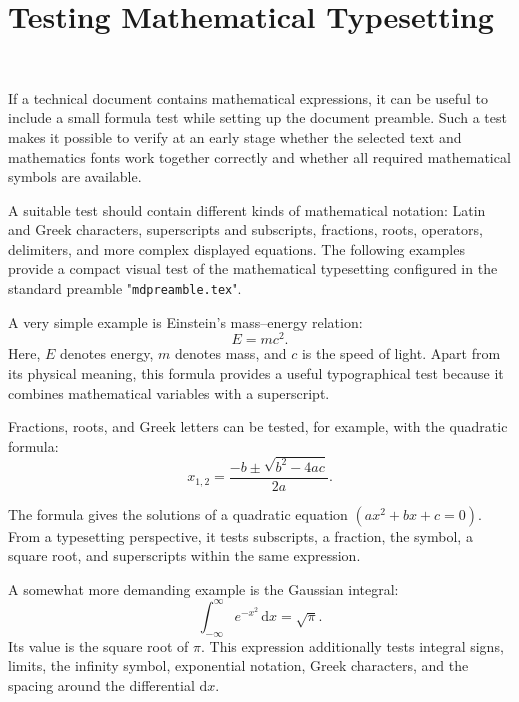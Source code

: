 \documentclass[
11pt,
a4paper,
oneside
]{scrbook}
\begin{document}
\section{Testing Mathematical Typesetting}
\label{sec:FormulaTest}
\begin{center}
	\\ 
\end{center}
If a technical document contains mathematical expressions, it can be useful to include a small formula test while setting up the document preamble. Such a test makes it possible to verify at an early stage whether the selected text and mathematics fonts work together correctly and whether all required mathematical symbols are available.

A suitable test should contain different kinds of mathematical notation: Latin and Greek characters, superscripts and subscripts, fractions, roots, operators, delimiters, and more complex displayed equations. The following examples provide a compact visual test of the mathematical typesetting configured in the standard \MDWordmark preamble "\texttt{mdpreamble.tex}".

A very simple example is Einstein's mass--energy relation:
\begin{equation}
	E = mc^2 .
	\tag{4.1}
\end{equation}
Here, $E$ denotes energy, $m$ denotes mass, and $c$ is the speed of light. Apart from its physical meaning, this formula provides a useful typographical test because it combines mathematical variables with a superscript.

Fractions, roots, and Greek letters can be tested, for example, with the quadratic formula:
\begin{equation}
	x_{1,2}
	=
	\frac{-b \pm \sqrt{b^2-4ac}}{2a}.
	\tag{4.2}
\end{equation}

The formula gives the solutions of a quadratic equation $(ax^2+bx+c=0)$. From a typesetting perspective, it tests subscripts, a fraction, the  symbol, a square root, and superscripts within the same expression.

A somewhat more demanding example is the Gaussian integral:
\begin{equation}
	\int_{-\infty}^{\infty} e^{-x^2}\,\mathrm{d}x
	=
	\sqrt{\pi}.
	\tag{4.3}
\end{equation}
Its value is the square root of $\pi$. This expression additionally tests integral signs, limits, the infinity symbol, exponential notation, Greek characters, and the spacing around the differential $\mathrm{d}x$.
\end{document}
